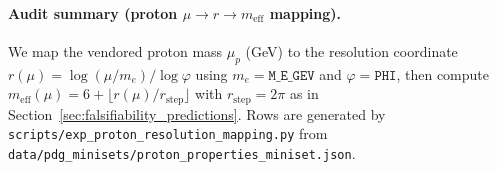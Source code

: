\paragraph{Audit summary (proton $\mu\to r\to m_{\mathrm{eff}}$ mapping).} \AuditTag We map the vendored proton mass $\mu_p$ (GeV) to the resolution coordinate $r(\mu)=\log(\mu/m_e)/\log\varphi$ using $m_e=\texttt{M\_E\_GEV}$ and $\varphi=\texttt{PHI}$, then compute $m_{\mathrm{eff}}(\mu)=6+\lfloor r(\mu)/r_{\mathrm{step}}\rfloor$ with $r_{\mathrm{step}}=2\pi$ as in Section~\ref{sec:falsifiability_predictions}. Rows are generated by \texttt{scripts/exp\_proton\_resolution\_mapping.py} from \texttt{data/pdg\_minisets/proton\_properties\_miniset.json}.